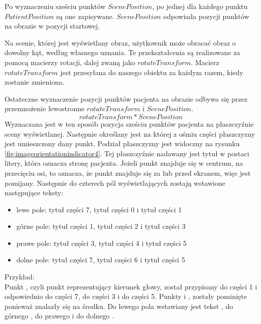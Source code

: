 \par
Po wyznaczeniu sześciu punktów $ScenePosition$, po jednej dla każdego punktu $PatientPosition$ są one zapisywane.
$ScenePosition$ odpowiada pozycji punktów na obrazie w pozycji startowej.

\par
Na scenie, której jest wyświetlany obraz, użytkownik może obracać obraz o dowolny kąt, według własnego uznania.
Te przekształcenia są realizowane za pomocą macierzy rotacji, dalej zwaną jako $rotateTransform$.
Macierz $rotateTransform$ jest przesyłana do naszego obiektu  za każdym razem, kiedy zostanie zmieniona.

\par
Ostateczne wyznaczenie pozycji punktów pacjenta na obrazie odbywa się przez przemnożenie lewostronne $rotateTransform$ i $ScenePosition$.
\[rotateTransform * ScenePosition\]
Wyznaczana jest w ten sposób pozycja sześciu punktów pacjenta na płaszczyźnie sceny wyświetlanej.
Następnie określany jest na której z ośmiu części płaszczyzny jest umieszczony dany punkt.
Podział płaszczyzny jest widoczny na rysunku \ref{fig:imageorientationindicator4}.
Tej płaszczyźnie nadawany jest tytuł w postaci litery, która oznacza stronę pacjenta.
Jeżeli punkt znajduje się w centrum, na przecięciu osi, to oznacza, że punkt znajduje się za lub przed ekranem, więc jest pomijany.
Następnie do czterech pól wyświetlających zostają wstawione następujące teksty:
\begin{itemize}
    \item lewe pole: tytuł części 7, tytuł części 0 i tytuł części 1
    \item górne pole: tytuł części 1, tytuł części 2 i tytuł części 3
    \item prawe pole: tytuł części 3, tytuł części 4 i tytuł części 5
    \item dolne pole: tytuł części 7, tytuł części 6 i tytuł części 5
\end{itemize}

\par
Przykład:\\
Punkt , czyli punkt reprezentujący kierunek głowy, został przypisany do części 1 i odpowiednio  do części 7,  do części 3 i  do części 5.
Punkty  i , zostały pominięte ponieważ znalazły się na środku.
Do lewego pola wstawiany jest tekst , do górnego , do prawego  i do dolnego .


